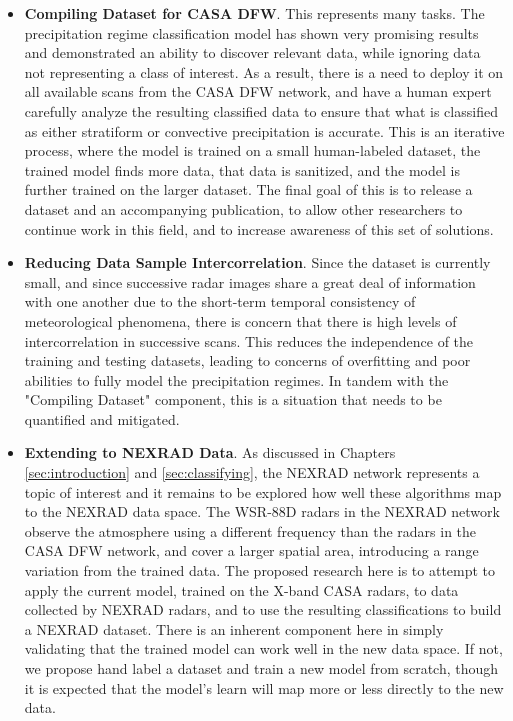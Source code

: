 \begin{itemize}
	\item \textbf{Compiling Dataset for CASA DFW}. 
	This represents many tasks. 
	The precipitation regime classification model has shown very promising results and demonstrated an ability to discover relevant data, while ignoring data not representing a class of interest.
	As a result, there is a need to deploy it on all available scans from the CASA DFW network, and have a human expert carefully analyze the resulting classified data to ensure that what is classified as either stratiform or convective precipitation is accurate.
	This is an iterative process, where the model is trained on a small human-labeled dataset, the trained model finds more data, that data is sanitized, and the model is further trained on the larger dataset.
	The final goal of this is to release a dataset and an accompanying publication, to allow other researchers to continue work in this field, and to increase awareness of this set of solutions.
	\item \textbf{Reducing Data Sample Intercorrelation}.
	Since the dataset is currently small, and since successive radar images share a great deal of information with one another due to the short-term temporal consistency of meteorological phenomena, there is concern that there is high levels of intercorrelation in successive scans.
	This reduces the independence of the training and testing datasets, leading to concerns of overfitting and poor abilities to fully model the precipitation regimes.
	In tandem with the "Compiling Dataset" component, this is a situation that needs to be quantified and mitigated.
	\item \textbf{Extending to NEXRAD Data}.
	As discussed in Chapters \ref{sec:introduction} and \ref{sec:classifying}, the NEXRAD network represents a topic of interest and it remains to be explored how well these algorithms map to the NEXRAD data space.
	The WSR-88D radars in the NEXRAD network observe the atmosphere using a different frequency than the radars in the CASA DFW network, and cover a larger spatial area, introducing a range variation from the trained data.
	The proposed research here is to attempt to apply the current model, trained on the X-band CASA radars, to data collected by NEXRAD radars, and to use the resulting classifications to build a NEXRAD dataset.
	There is an inherent component here in simply validating that the trained model can work well in the new data space.
	If not, we propose hand label a dataset and train a new model from scratch, though it is expected that the model's learn will map more or less directly to the new data.

\end{itemize}
